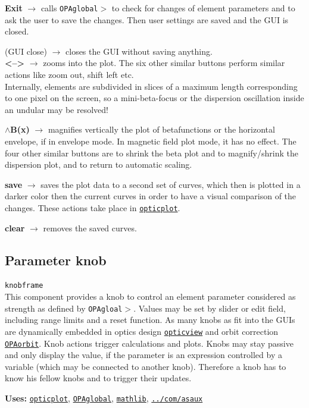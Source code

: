 \documentclass[12pt]{article}
\newcommand\code[1]{{\tt #1}}
\newcommand{\ofld}[1]{\colorbox{black!15}{{\bf #1}}}
\newcommand{\ofldx}[1]{\colorbox{black!15}{(#1)}}
\newcommand\guico[1]{{\color{blue}\code{#1}}}
\newcommand{\unico}[1]{{\color{burntorange}\code{#1}}}
\newcommand{\evcod}[2]{\ofld{#1} $\rightarrow$ \guico{#2}}
\newcommand{\evcodx}[2]{\ofldx{#1} $\rightarrow$ \guico{#2}}
\newcommand{\prcod}[2]{\opauni{#1}$>$\unico{#2}}
\newcommand{\opagui}[1]{\colorbox{blue!20}{\code{#1}}}
\newcommand{\ogui}[1]{\hyperref[#1]{\opagui{#1}}}
\newcommand{\opaguif}[1]{\colorbox{violet!30}{\code{#1}}}
\newcommand{\oguifh}[2]{\subsection{\label{#2}#1}{\Huge\opaguif{#2}}\\}
\newcommand{\opauni}[1]{\colorbox{orange!30}{\code{#1}}}
\newcommand{\ouni}[1]{\hyperref[#1]{\opauni{#1}}}
\newcommand{\uses}[1]{{\bf Uses: } #1}
\newcommand{\desc}[1]{#1}
\newcommand{\feature}[1]{{\color{cadmiumgreen} #1}}
\begin{document}
{\evcod{Exit}{butexitClick} calls \prcod{OPAglobal}{EllaSave} to check for changes of element parameters and to ask the user to save the changes. Then user settings are saved and the GUI is closed.

\evcodx{GUI close}{FormClose} closes the GUI without saving anything.\\

\evcod{\textless--\textgreater}{buzoominClick} zooms into the plot. The six other similar buttons perform similar actions like zoom out, shift left etc.\\ \feature{Internally, elements are subdivided in slices of a maximum length corresponding to one pixel on the screen, so a mini-beta-focus or the dispersion oscillation inside an undular may be resolved!}

\evcod{$\wedge$B(x)}{buyupClick} magnifies vertically the plot of betafunctions or the horizontal envelope, if in envelope mode. In magnetic field plot mode, it has no effect. The four other similar buttons are to shrink the beta plot and to magnify/shrink  the dispersion plot, and to return to automatic scaling.

\evcod{save}{bucsaveClick} saves the plot data to a second set of curves, which then is plotted in a darker color then the current curves in order to have a visual comparison of the changes. These actions take place in \ouni{opticplot}.

\evcod{clear}{bucclearClick} removes the saved curves.

}




\oguifh{Parameter knob}{knobframe} 

\desc{This component provides a knob to control an element parameter considered as strength as defined by \prcod{OPAgloal}{putkval/getkval}. Values may be set by slider or edit field, including range limits and a reset function. As many knobs as fit into the GUIs are dynamically embedded in optics design \ogui{opticview} and orbit correction \ogui{OPAorbit}. Knob actions trigger calculations and plots. Knobs may stay passive and only display the value, if the parameter is an expression controlled by a variable (which may be connected to another knob). Therefore a knob has to know his fellow knobs and to trigger their updates.}

\uses{\ouni{opticplot}, \ouni{OPAglobal}, \ouni{mathlib}, \ouni{../com/asaux}} 
 
\end{document}
